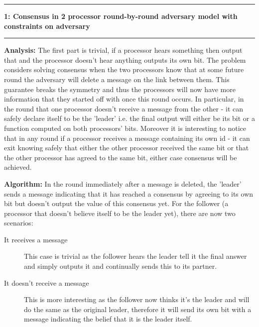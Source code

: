 \documentclass[11pt]{article}
\newcommand\question[2]{\vspace{.25in}\hrule\textbf{#1: #2}\vspace{.5em}\hrule\vspace{.10in}}
\newcommand\analysis{\vspace{.10in}\textbf{Analysis: }\newline}
\newcommand\algorithm{\vspace{.10in}\textbf{Algorithm: }}
\begin{document}
\raggedright
\newcommand\NAME{Siddharth Joshi}  %
\newcommand\HWNUM{}              %


\question{1}{Consensus in 2 processor round-by-round adversary model with constraints on adversary} 

\analysis
The first part is trivial, if a processor hears something then output that and the processor doesn't hear anything outputs its own bit. 
The problem considers solving consensus when the two processors know that at some future round the adversary will delete a message on the link between them. This guarantee breaks the symmetry and thus the processors will now have more information that they started off with once this round occurs. In particular, in the round that one processor doesn't receive a message from the other - it can safely declare itself to be the 'leader' i.e. the final output will either be its bit or a function computed on both processors' bits. Moreover it is interesting to notice that in any round if a processor receives a message containing its own id - it can exit knowing safely that either the other processor received the same bit or that the other processor has agreed to the same bit, either case consensus will be achieved. \newline

\algorithm
In the round immediately after a message is deleted, the 'leader' sends a message indicating that it has reached a consensus by agreeing to its own bit but doesn't output the value of this consensus yet.
For the follower (a processor that doesn't believe itself to be the leader yet), there are now two scenarios:
\begin{description}
\item[It receives a message] 
This case is trivial as the follower hears the leader tell it the final answer and simply outputs it and continually sends this to its partner. 
\item[It doesn't receive a message]
This is more interesting as the follower now thinks it's the leader and will do the same as the original leader, therefore it will send its own bit with a message indicating the belief that it is the leader itself.  
\end{description}
\end{document}

